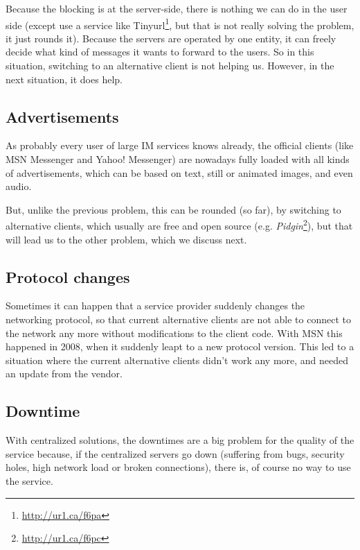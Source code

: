 Because the blocking is at the server-side, there is nothing we can do in the
user side (except use a service like
Tinyurl\footnote{\url{http://ur1.ca/f6pa}}, but that is not really solving
the problem, it just rounds it). Because the servers are operated by one entity,
it can freely decide what kind of messages it wants to forward to the users. So
in this situation, switching to an alternative client is not helping us.
However, in the next situation, it does help.


\subsection{Advertisements}
\label{ss:jim_client_server:dangers_proprietary:advertisements}

As probably every user of large IM services knows already, the
of\hbox{}f\hbox{}icial clients (like MSN Messenger and Yahoo! Messenger) are
nowadays fully loaded with all kinds of advertisements, which can be based on
text, still or animated images, and even audio.

But, unlike the previous problem, this can be rounded (so far), by switching to
alternative clients, which usually are free and open source (e.g.
\textit{Pidgin}\footnote{\url{http://ur1.ca/f6pc}}), but that will lead us to
the other problem, which we discuss next.


\subsection{Protocol changes}
\label{ss:jim_client_server:dangers_proprietary:protocol_changes}

Sometimes it can happen that a service provider suddenly changes the networking
protocol, so that current alternative clients are not able to connect to the
network any more without modif\hbox{}ications to the client code. With MSN this
happened in 2008, when it suddenly leapt to a new protocol version. This led to
a situation where the current alternative clients didn't work any more, and
needed an update from the vendor.


\subsection{Downtime}
\label{ss:jim_client_server:dangers_proprietary:downtime}

With centralized solutions, the downtimes are a big problem for the quality of
the service because, if the centralized servers go down (suf\hbox{}fering from
bugs, security holes, high network load or broken connections), there is, of
course no way to use the service.


